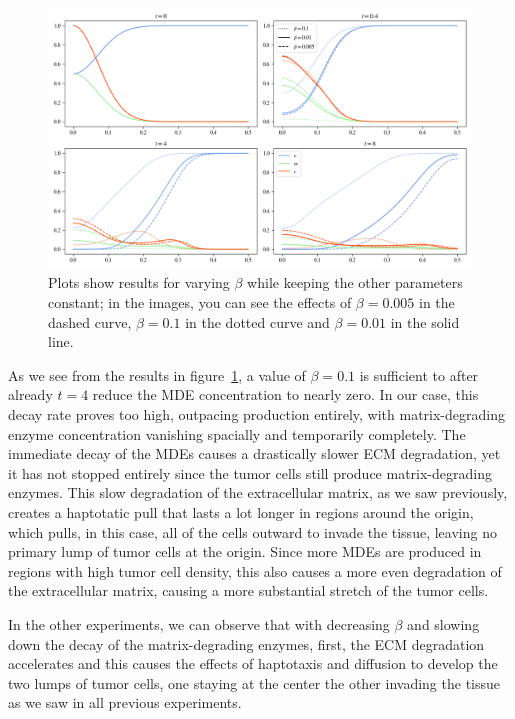 \begin{figure}[h]
 \centering
 \includegraphics[width=\textwidth]{resources/images/beta_variation.png}
 \caption{Plots show results for varying $\beta$ while keeping the other parameters constant; in the images, you can see the effects of $\beta=0.005$ in the dashed curve, $\beta=0.1$ in the dotted curve and $\beta=0.01$ in the solid line.}
 \label{fig:beta_variation}
\end{figure}
As we see from the results in figure~\ref{fig:beta_variation}, a value of $\beta=0.1$ is sufficient to after already $t=4$ reduce the MDE concentration to nearly zero. In our case, this decay rate proves too high, outpacing production entirely, with matrix-degrading enzyme concentration vanishing spacially and temporarily completely. The immediate decay of the MDEs causes a drastically slower ECM degradation, yet it has not stopped entirely since the tumor cells still produce matrix-degrading enzymes. This slow degradation of the extracellular matrix, as we saw previously, creates a haptotatic pull that lasts a lot longer in regions around the origin, which pulls, in this case, all of the cells outward to invade the tissue, leaving no primary lump of tumor cells at the origin. Since more MDEs are produced in regions with high tumor cell density, this also causes a more even degradation of the extracellular matrix, causing a more substantial stretch of the tumor cells.

In the other experiments, we can observe that with decreasing $\beta$ and slowing down the decay of the matrix-degrading enzymes, first, the ECM degradation accelerates and this causes the effects of haptotaxis and diffusion to develop the two lumps of tumor cells, one staying at the center the other invading the tissue as we saw in all previous experiments.


